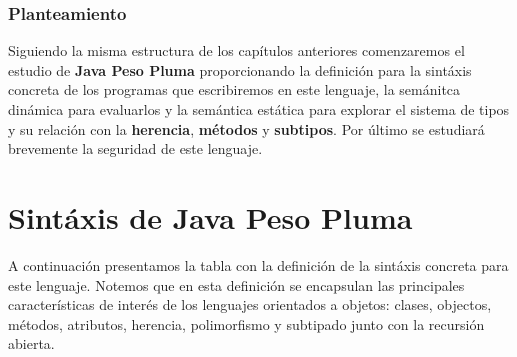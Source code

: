 \subsubsection{Planteamiento}
Siguiendo la misma estructura de los capítulos anteriores comenzaremos el estudio de \textbf{Java Peso Pluma} proporcionando la definición para la sintáxis concreta de los programas que escribiremos en este lenguaje, la semánitca dinámica para evaluarlos y la semántica estática para explorar el sistema de tipos y su relación con la \textbf{herencia}, \textbf{métodos} y \textbf{subtipos}. Por último se estudiará brevemente la seguridad de este lenguaje.

\section{Sintáxis de Java Peso Pluma}
A continuación presentamos la tabla con la definición de la sintáxis concreta para este lenguaje. Notemos que en esta definición se encapsulan las principales características de interés de los lenguajes orientados a objetos: clases, objectos, métodos, atributos, herencia, polimorfismo y subtipado junto con la recursión abierta.\\

